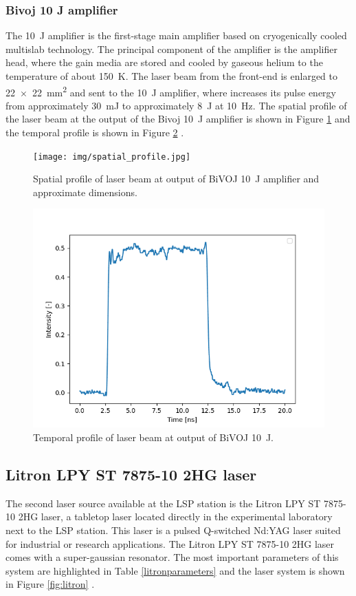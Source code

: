 \subsubsection*{Bivoj 10 J amplifier}

The \SI{10}{\joule}  amplifier is the first-stage main amplifier based on
cryogenically cooled multislab technology. The principal
component of the amplifier is the amplifier head, where the
gain media are stored and cooled by gaseous helium to 
the temperature of about \SI{150}{\kelvin}. The laser beam from the front-end
is enlarged to \SI{22 x 22}{\mm\squared} and sent to the \SI{10}{\joule} amplifier, where
increases its pulse energy from approximately \SI{30}{\milli\joule} to
approximately \SI{8}{\joule} at \SI{10}{\hertz}. The spatial profile of the laser beam at the output of the Bivoj \SI{10}{\joule} amplifier is shown in Figure \ref{fig:spatialprofile} and the temporal profile is shown in Figure \ref{fig:temporalprofile} \cite{saumyabrata}.

\begin{figure}[h]
    \centering
    \texttt{[image: img/spatial\_profile.jpg]}
    \caption{Spatial profile of laser beam at output of BiVOJ \SI{10}{\joule} amplifier and approximate dimensions.}
    \label{fig:spatialprofile}
\end{figure}

\begin{figure}[h]
    \centering
    \includegraphics[width=0.6\linewidth]{img/temporal_profile_bivoj.png}
    \caption{Temporal profile of laser beam at output of BiVOJ \SI{10}{\joule}.}
    \label{fig:temporalprofile}
\end{figure}

\subsection{Litron LPY ST 7875-10 2HG laser}

The second laser source available at the LSP station is the Litron LPY ST 7875-10 2HG laser, a tabletop laser located directly in the experimental laboratory next to the LSP station. This laser is a pulsed Q-switched Nd:YAG laser suited for industrial or research applications. The Litron  LPY ST 7875-10 2HG laser comes with a super-gaussian resonator. The most important parameters of this system are highlighted in Table \ref{litronparameters} and the laser system is shown in Figure \ref{fig:litron} \cite{litron}. 


